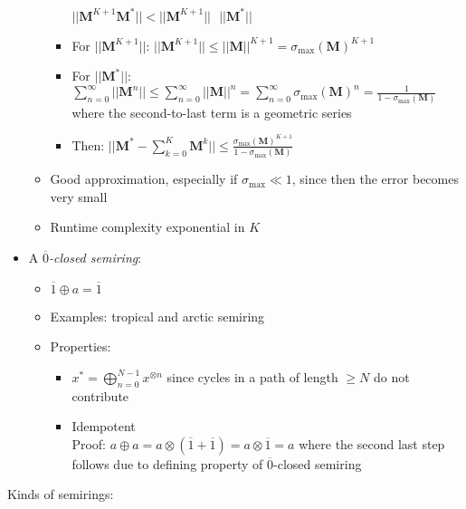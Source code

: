 \begin{itemize}
\begin{itemize}
\begin{itemize}
            $
            || \boldsymbol{M}^{K+1} \boldsymbol{M}^* || < || \boldsymbol{M}^{K+1} || \textrm{ } || \boldsymbol{M}^* ||
            $
            \item For $|| \boldsymbol{M}^{K+1} ||$:
            $
            || \boldsymbol{M}^{K+1} || \leq || \boldsymbol{M} ||^{K+1} = \sigma_{\max}(\boldsymbol{M})^{K+1}
            $
            \item For $|| \boldsymbol{M}^* ||$:
            $
            \sum_{n=0}^\infty || \boldsymbol{M}^n || \leq \sum_{n=0}^\infty || \boldsymbol{M} ||^n = \sum_{n=0}^\infty \sigma_{\max}(\boldsymbol{M})^n = \frac{1}{1 - \sigma_{\max}(\boldsymbol{M})}
            $ where the second-to-last term is a geometric series
            \item Then: $
            || \boldsymbol{M}^* - \sum_{k=0}^K \boldsymbol{M}^k || \leq \frac{\sigma_{\max}(\boldsymbol{M})^{K+1}}{1 - \sigma_{\max}(\boldsymbol{M})}
            $
        \end{itemize}
        \item Good approximation, especially if $\sigma_{\max} \ll 1$, since then the error becomes very small
        \item Runtime complexity exponential in $K$
    \end{itemize}
    \item A \emph{$\overline{0}$-closed semiring}:
    \begin{itemize}
        \item $\overline{1} \oplus a = \overline{1}$
        \item Examples: tropical and arctic semiring
        \item Properties:
        \begin{itemize}
            \item $
            x^* = \bigoplus_{n=0}^{N-1} x^{\otimes n}$ since cycles in a path of length $\geq N$ do not contribute 
            \item Idempotent\\
            Proof:
            $a \oplus a = a \otimes (\overline{1} + \overline{1}) = a \otimes \overline{1} = a$ where the second last step follows due to defining property of $\overline{0}$-closed semiring 
        \end{itemize}
    \end{itemize}
\end{itemize}
Kinds of semirings:
